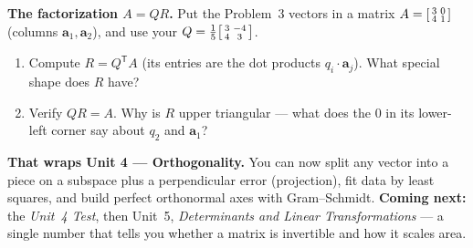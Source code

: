 \documentclass[10pt]{article}
\newcommand{\avec}{\mathbf{a}}
\newcommand{\T}{\mathsf{T}}
\begin{document}
\begin{extensionbox}
\textbf{The factorization $A=QR$.} Put the Problem~3 vectors in a matrix
$A=\begin{bsmallmatrix} 3&0\\4&1 \end{bsmallmatrix}$ (columns $\avec_1,\avec_2$), and use your
$Q=\tfrac15\begin{bsmallmatrix} 3&-4\\4&3 \end{bsmallmatrix}$.
\begin{enumerate}[label=(\alph*), leftmargin=1.8em, itemsep=5pt]
  \item Compute $R=Q^{\T}A$ (its entries are the dot products $q_i\!\cdot\!\avec_j$). What special shape does
        $R$ have?
  \item Verify $QR=A$. Why is $R$ upper triangular --- what does the $0$ in its lower-left corner say about
        $q_2$ and $\avec_1$?
\end{enumerate}
\end{extensionbox}

\begin{spiralbox}
\textbf{That wraps Unit 4 --- Orthogonality.} You can now split any vector into a piece on a subspace plus a
perpendicular error (projection), fit data by least squares, and build perfect orthonormal axes with
Gram--Schmidt. \textbf{Coming next:} the \emph{Unit~4 Test}, then Unit~5, \emph{Determinants and Linear
Transformations} --- a single number that tells you whether a matrix is invertible and how it scales area.
\end{spiralbox}
\end{document}
